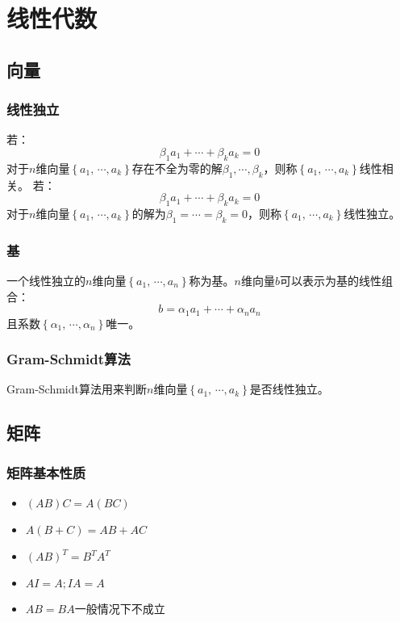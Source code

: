 \chapter{线性代数}
\section{向量}
\subsection{线性独立}
若：
\[\beta_1a_1+\cdots+\beta_ka_k=0\]
对于$ n $维向量$ \left \{ a_1,\,\cdots,a_k \right \} $存在不全为零的解$ \beta_1, \cdots,\beta_k $，则称$ \left \{ a_1,\,\cdots,a_k \right \} $线性相关。\newline
若：
\[\beta_1a_1+\cdots+\beta_ka_k=0\]
对于$ n $维向量$ \left \{ a_1,\,\cdots,a_k \right \} $的解为$ \beta_1=\cdots=\beta_k=0 $，则称$ \left \{ a_1,\,\cdots,a_k \right \} $线性独立。
\subsection{基}
一个线性独立的$ n $维向量$ \left \{ a_1,\,\cdots,a_n \right \} $称为基。$ n $维向量$ b $可以表示为基的线性组合：
\[ b=\alpha_1 a_1+\cdots+\alpha_n a_n \]
且系数$ \left \{ \alpha_1,\,\cdots,\alpha_n \right \} $唯一。
\subsection{Gram-Schmidt算法}
Gram-Schmidt算法用来判断$ n $维向量$ \left \{ a_1,\,\cdots,a_k \right \} $是否线性独立。

\section{矩阵}
\subsection{矩阵基本性质}
\begin{itemize}
	\item $ (AB)C = A(BC) $
	\item $ A(B+C) = AB +AC $
	\item $ (AB)^T=B^TA^T $
	\item $ AI=A; IA=A $
	\item $ AB=BA $一般情况下不成立
\end{itemize}